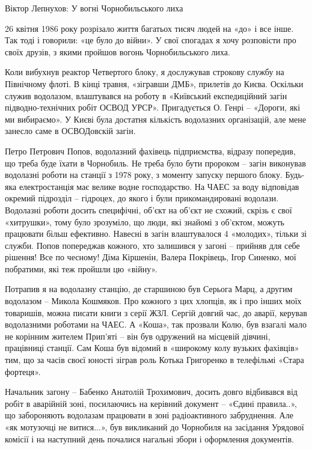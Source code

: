 Віктор Лепнухов: У вогні Чорнобильського лиха

26 квітня 1986 року розрізало життя багатьох тисяч людей на «до» і все інше.
Так тоді і говорили: «це було до війни». У свої спогадах я хочу розповісти про
своїх друзів, з якими пройшов вогонь Чорнобильського лиха.

Коли вибухнув реактор Четвертого блоку, я дослужував строкову службу на
Північному флоті. В кінці травня, «зігравши ДМБ», прилетів до Києва. Оскільки
служив водолазом, влаштувався на роботу в «Київський експедиційний загін
підводно-технічних робіт ОСВОД УРСР». Пригадується О. Генрі – «Дороги, які ми
вибираємо». У Києві була достатня кількість водолазних організацій, але мене
занесло саме в ОСВОДовскій загін.

Петро Петрович Попов, водолазний фахівець підприємства, відразу попередив, що
треба буде їхати в Чорнобиль. Не треба було бути пророком – загін виконував
водолазні роботи на станції з 1978 року, з моменту запуску першого блоку.
Будь-яка електростанція має велике водне господарство. На ЧАЕС за воду
відповідав окремий підрозділ – гідроцех, до якого і були прикомандировані
водолази. Водолазні роботи досить специфічні, об'єкт на об'єкт не схожий,
скрізь є свої «хитрушки», тому було зрозуміло, що люди, які знайомі з об'єктом,
можуть працювати більш ефективно. Навесні в загін влаштувалося 4 «молодих»,
тільки зі служби. Попов попереджав кожного, хто залишився у загоні – прийняв
для себе рішення! Все по чесному! Діма Кіршенін, Валера Покрівець, Ігор
Синенко, мої побратими, які теж пройшли цю «війну».

Потрапив я на водолазну станцію, де старшиною був Серьога Марц, а другим
водолазом – Микола Кошмяков. Про кожного з цих хлопців, як і про інших моїх
товаришів, можна писати книги з серії ЖЗЛ. Сергій довгий час, до аварії,
керував водолазними роботами на ЧАЕС. А «Коша», так прозвали Колю, був взагалі
мало не корінним жителем Прип'яті – він був одружений на місцевій дівчині,
працівниці станції. Сам Коша був відомий в «широкому колу вузьких фахівців»
тим, що за часів своєї юності зіграв роль Котька Григоренко в телефільмі «Стара
фортеця».

Начальник загону – Бабенко Анатолій Трохимович, досить довго відбивався від
робіт в аварійній зоні, посилаючись на керівний документ – «Єдині правила..»,
що забороняють водолазам працювати в зоні радіоактивного забруднення. Але «як
мотузочці не витися...», був викликаний до Чорнобиля на засідання Урядової
комісії і на наступний день почалися нагальні збори і оформлення документів.

